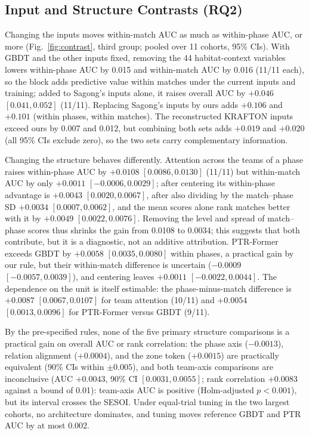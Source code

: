 \documentclass[sigconf,anonymous]{acmart}
\begin{document}
\subsection{Input and Structure Contrasts (RQ2)}
\label{sec:results:inputs}
Changing the inputs moves within-match AUC as much as within-phase AUC, or more (Fig.~\ref{fig:contrast}, third group; pooled over 11 cohorts, 95\% CIs). With GBDT and the other inputs fixed, removing the 44 habitat-context variables lowers within-phase AUC by 0.015 and within-match AUC by 0.016 (11/11 each), so the block adds predictive value within matches under the current inputs and training; added to Sagong's inputs alone, it raises overall AUC by $+0.046$ $[0.041,\allowbreak 0.052]$ (11/11). Replacing Sagong's inputs by ours adds $+0.106$ and $+0.101$ (within phases, within matches). The reconstructed KRAFTON inputs exceed ours by 0.007 and 0.012, but combining both sets adds $+0.019$ and $+0.020$ (all 95\% CIs exclude zero), so the two sets carry complementary information.

Changing the structure behaves differently. Attention across the teams of a phase raises within-phase AUC by $+0.0108$ $[0.0086,\allowbreak 0.0130]$ (11/11) but within-match AUC by only $+0.0011$ $[-0.0006,\allowbreak 0.0029]$; after centering its within-phase advantage is $+0.0043$ $[0.0020,\allowbreak 0.0067]$, after also dividing by the match--phase SD $+0.0034$ $[0.0007,\allowbreak 0.0062]$, and the mean scores alone rank matches better with it by $+0.0049$ $[0.0022,\allowbreak 0.0076]$. Removing the level and spread of match--phase scores thus shrinks the gain from 0.0108 to 0.0034; this suggests that both contribute, but it is a diagnostic, not an additive attribution. PTR-Former exceeds GBDT by $+0.0058$ $[0.0035,\allowbreak 0.0080]$ within phases, a practical gain by our rule, but their within-match difference is uncertain ($-0.0009$ $[-0.0057,\allowbreak 0.0039]$), and centering leaves $+0.0011$ $[-0.0022,\allowbreak 0.0044]$. The dependence on the unit is itself estimable: the phase-minus-match difference is $+0.0087$ $[0.0067,\allowbreak 0.0107]$ for team attention (10/11) and $+0.0054$ $[0.0013,\allowbreak 0.0096]$ for PTR-Former versus GBDT (9/11).

By the pre-specified rules, none of the five primary structure comparisons is a practical gain on overall AUC or rank correlation: the phase axis ($-0.0013$), relation alignment ($+0.0004$), and the zone token ($+0.0015$) are practically equivalent (90\% CIs within $\pm0.005$), and both team-axis comparisons are inconclusive (AUC $+0.0043$, 90\% CI $[0.0031,\allowbreak 0.0055]$; rank correlation $+0.0083$ against a bound of 0.01): team-axis AUC is positive (Holm-adjusted $p<0.001$), but its interval crosses the SESOI. Under equal-trial tuning in the two largest cohorts, no architecture dominates, and tuning moves reference GBDT and PTR AUC by at most 0.002.
\end{document}
